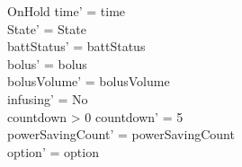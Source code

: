 \begin{schema}{OnHold}
	time' = time\\ State' = State\\
	battStatus' = battStatus\\
	 \pagebreak
	bolus' = bolus\\
	bolusVolume' = bolusVolume\\
	infusing' = No\\
	countdown > 0 \land countdown' = 5\\
	powerSavingCount' = powerSavingCount\\ option' = option\\
\end{schema}

